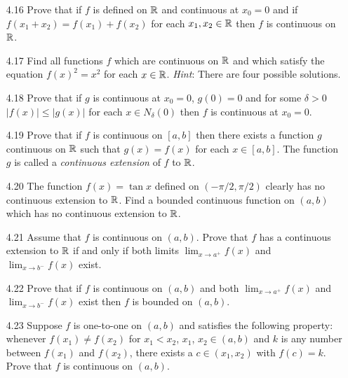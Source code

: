 \begin{enumerate}
   \item[4.16] Prove that if $f$ is defined on $\mathbb{R}$ and continuous at $x_0 = 0$
               and if $f(x_1 + x_2) = f(x_1) + f(x_2)$ for each
               $x_1, x_2 \in \mathbb{R}$ then $f$ is continuous on $\mathbb{R}$.
   \item[4.17] Find all functions $f$ which are continuous on $\mathbb{R}$ and which
               satisfy the equation $f(x)^2 = x^2$ for each $x \in \mathbb{R}$.
               \textit{Hint}: There are four possible solutions.
   \item[4.18] Prove that if $g$ is continuous at $x_0 = 0$, $g(0) = 0$ and for
               some $\delta > 0$ $|f(x)| \le |g(x)|$ for each
               $x \in N_\delta(0)$ then $f$ is continuous at $x_0 = 0$.
   \item[4.19] Prove that if $f$ is continuous on $[a, b]$ then there exists a
               function $g$ continuous on $\mathbb{R}$ such that $g(x) = f(x)$ for each
               $x \in [a, b]$. The function $g$ is called a
               \textit{continuous extension} of $f$ to $\mathbb{R}$.
   \item[4.20] The function $f(x) = \tan x$ defined on $(-\pi/2, \pi/2)$ clearly
               has no continuous extension to $\mathbb{R}$. Find a bounded continuous
               function on $(a, b)$ which has no continuous extension to $\mathbb{R}$.
   \item[4.21] Assume that $f$ is continuous on $(a, b)$. Prove that $f$ has a
               continuous extension to $\mathbb{R}$ if and only if both limits
               $\lim_{x\rightarrow a^+}f(x)$ and $\lim_{x\rightarrow b^-}f(x)$
               exist.
   \item[4.22] Prove that if $f$ is continuous on $(a, b)$ and both
               $\lim_{x\rightarrow a^+}f(x)$ and $\lim_{x\rightarrow b^-}f(x)$
               exist then $f$ is bounded on $(a, b)$.
   \item[4.23] Suppose $f$ is one-to-one on $(a, b)$ and satisfies the following
               property: whenever $f(x_1) \neq f(x_2)$ for $x_1 < x_2$, $x_1$,
               $x_2 \in (a, b)$ and $k$ is any number between $f(x_1)$ and
               $f(x_2)$, there exists a $c \in (x_1, x_2)$ with $f(c) = k$.
               Prove that $f$ is continuous on $(a, b)$.
\end{enumerate}
